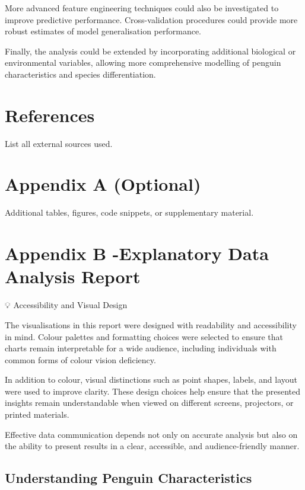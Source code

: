 \documentclass[
]{article}
\begin{document}
More advanced feature engineering techniques could also be investigated
to improve predictive performance. Cross-validation procedures could
provide more robust estimates of model generalisation performance.

Finally, the analysis could be extended by incorporating additional
biological or environmental variables, allowing more comprehensive
modelling of penguin characteristics and species differentiation.

\section{References}\label{references}

List all external sources used.

\section{Appendix A (Optional)}\label{appendix-a-optional}

Additional tables, figures, code snippets, or supplementary material.

\section{Appendix B -Explanatory Data Analysis
Report}\label{appendix-b--explanatory-data-analysis-report}

💡 Accessibility and Visual Design

The visualisations in this report were designed with readability and
accessibility in mind. Colour palettes and formatting choices were
selected to ensure that charts remain interpretable for a wide audience,
including individuals with common forms of colour vision deficiency.

In addition to colour, visual distinctions such as point shapes, labels,
and layout were used to improve clarity. These design choices help
ensure that the presented insights remain understandable when viewed on
different screens, projectors, or printed materials.

Effective data communication depends not only on accurate analysis but
also on the ability to present results in a clear, accessible, and
audience-friendly manner.

\subsection{Understanding Penguin
Characteristics}\label{understanding-penguin-characteristics}
\end{document}
